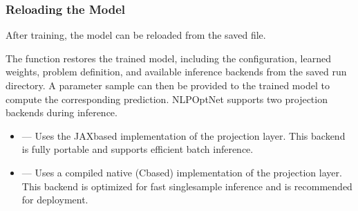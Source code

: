 \documentclass[letterpaper,10pt,english,openany,oneside]{sphinxmanual}
\begin{document}
\subsubsection{Reloading the Model}
\label{\detokenize{user-guide/training-and-inference:reloading-the-model}}
\sphinxAtStartPar
After training, the model can be reloaded from the saved  file.

\begin{sphinxVerbatim}[commandchars=\\\{\}]
 
  
\end{sphinxVerbatim}

\sphinxAtStartPar
The  function restores the trained model, including the configuration, learned weights, problem definition, and available inference backends from the saved run directory. A parameter sample can then be provided to the trained model to compute the corresponding prediction. NLPOpt\sphinxhyphen{}Net supports two projection backends during inference.

\begin{sphinxVerbatim}[commandchars=\\\{\}]
   
   
\end{sphinxVerbatim}
\begin{itemize}
\item {} 
\sphinxAtStartPar
{} — Uses the JAX\sphinxhyphen{}based implementation of the projection layer. This backend is fully portable and supports efficient batch inference.

\item {} 
\sphinxAtStartPar
{} — Uses a compiled native (C\sphinxhyphen{}based) implementation of the projection layer. This backend is optimized for fast single\sphinxhyphen{}sample inference and is recommended for deployment.

\end{itemize}
\end{document}
